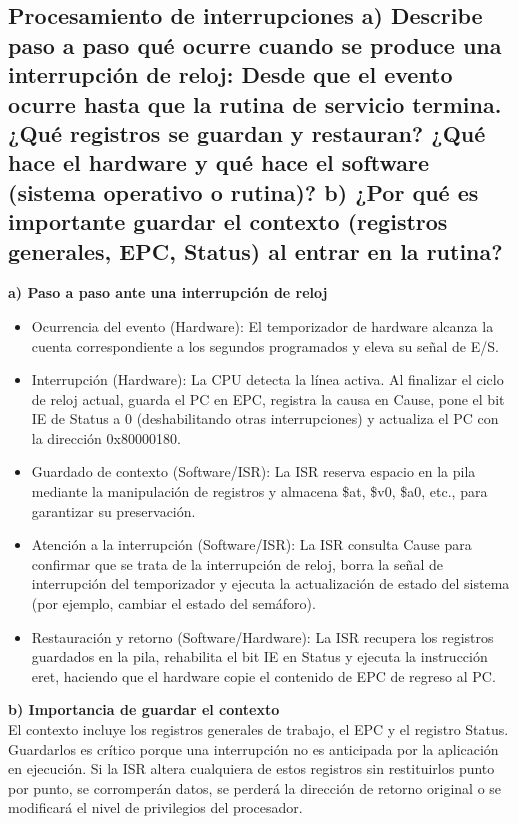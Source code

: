 \documentclass[12pt, a4paper]{article}
\begin{document}
\subsection{Procesamiento de interrupciones a) Describe paso a paso qué ocurre cuando se produce una interrupción de reloj: Desde que el evento ocurre hasta que la rutina de servicio termina. ¿Qué registros se guardan y restauran? ¿Qué hace el hardware y qué hace el software (sistema operativo o rutina)? b) ¿Por qué es importante guardar el contexto (registros generales, EPC, Status) al entrar en la rutina?}
    \textbf{a) Paso a paso ante una interrupción de reloj}
    \begin{itemize}
        \item Ocurrencia del evento (Hardware): El temporizador de hardware alcanza la cuenta correspondiente a los segundos programados y eleva su señal de E/S.
        \item Interrupción (Hardware): La CPU detecta la línea activa. Al finalizar el ciclo de reloj actual, guarda el PC en EPC, registra la causa en Cause, pone el bit IE de Status a 0 (deshabilitando otras interrupciones) y actualiza el PC con la dirección 0x80000180.
        \item Guardado de contexto (Software/ISR): La ISR reserva espacio en la pila mediante la manipulación de registros y almacena \$at, \$v0, \$a0, etc., para garantizar su preservación.
        \item Atención a la interrupción (Software/ISR): La ISR consulta Cause para confirmar que se trata de la interrupción de reloj, borra la señal de interrupción del temporizador y ejecuta la actualización de estado del sistema (por ejemplo, cambiar el estado del semáforo).
        \item Restauración y retorno (Software/Hardware): La ISR recupera los registros guardados en la pila, rehabilita el bit IE en Status y ejecuta la instrucción eret, haciendo que el hardware copie el contenido de EPC de regreso al PC.
    \end{itemize}
    \textbf{b) Importancia de guardar el contexto}\\
    El contexto incluye los registros generales de trabajo, el EPC y el registro Status. Guardarlos es crítico porque una interrupción no es anticipada por la aplicación en ejecución. Si la ISR altera cualquiera de estos registros sin restituirlos punto por punto, se corromperán datos, se perderá la dirección de retorno original o se modificará el nivel de privilegios del procesador.
\end{document}
